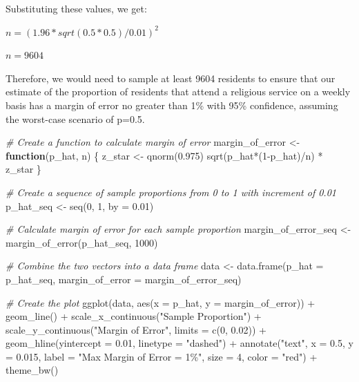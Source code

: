 \documentclass[
]{article}
\newenvironment{Shaded}{\begin{snugshade}}{\end{snugshade}}
\newcommand{\AttributeTok}[1]{\textcolor[rgb]{0.77,0.63,0.00}{#1}}
\newcommand{\CommentTok}[1]{\textcolor[rgb]{0.56,0.35,0.01}{\textit{#1}}}
\newcommand{\ControlFlowTok}[1]{\textcolor[rgb]{0.13,0.29,0.53}{\textbf{#1}}}
\newcommand{\DecValTok}[1]{\textcolor[rgb]{0.00,0.00,0.81}{#1}}
\newcommand{\FloatTok}[1]{\textcolor[rgb]{0.00,0.00,0.81}{#1}}
\newcommand{\FunctionTok}[1]{\textcolor[rgb]{0.00,0.00,0.00}{#1}}
\newcommand{\NormalTok}[1]{#1}
\newcommand{\OtherTok}[1]{\textcolor[rgb]{0.56,0.35,0.01}{#1}}
\newcommand{\SpecialCharTok}[1]{\textcolor[rgb]{0.00,0.00,0.00}{#1}}
\newcommand{\StringTok}[1]{\textcolor[rgb]{0.31,0.60,0.02}{#1}}
\begin{document}
Substituting these values, we get:

\(n = (1.96 * sqrt(0.5 * 0.5) / 0.01)^2\)

\(n = 9604\)

Therefore, we would need to sample at least 9604 residents to ensure
that our estimate of the proportion of residents that attend a religious
service on a weekly basis has a margin of error no greater than 1\% with
95\% confidence, assuming the worst-case scenario of p=0.5.

\begin{Shaded}
\begin{Highlighting}[]
\CommentTok{\# Create a function to calculate margin of error}
\NormalTok{margin\_of\_error }\OtherTok{\textless{}{-}} \ControlFlowTok{function}\NormalTok{(p\_hat, n) \{}
\NormalTok{  z\_star }\OtherTok{\textless{}{-}} \FunctionTok{qnorm}\NormalTok{(}\FloatTok{0.975}\NormalTok{)}
  \FunctionTok{sqrt}\NormalTok{(p\_hat}\SpecialCharTok{*}\NormalTok{(}\DecValTok{1}\SpecialCharTok{{-}}\NormalTok{p\_hat)}\SpecialCharTok{/}\NormalTok{n) }\SpecialCharTok{*}\NormalTok{ z\_star}
\NormalTok{\}}

\CommentTok{\# Create a sequence of sample proportions from 0 to 1 with increment of 0.01}
\NormalTok{p\_hat\_seq }\OtherTok{\textless{}{-}} \FunctionTok{seq}\NormalTok{(}\DecValTok{0}\NormalTok{, }\DecValTok{1}\NormalTok{, }\AttributeTok{by =} \FloatTok{0.01}\NormalTok{)}

\CommentTok{\# Calculate margin of error for each sample proportion}
\NormalTok{margin\_of\_error\_seq }\OtherTok{\textless{}{-}} \FunctionTok{margin\_of\_error}\NormalTok{(p\_hat\_seq, }\DecValTok{1000}\NormalTok{)}

\CommentTok{\# Combine the two vectors into a data frame}
\NormalTok{data }\OtherTok{\textless{}{-}} \FunctionTok{data.frame}\NormalTok{(}\AttributeTok{p\_hat =}\NormalTok{ p\_hat\_seq, }\AttributeTok{margin\_of\_error =}\NormalTok{ margin\_of\_error\_seq)}

\CommentTok{\# Create the plot}
\FunctionTok{ggplot}\NormalTok{(data, }\FunctionTok{aes}\NormalTok{(}\AttributeTok{x =}\NormalTok{ p\_hat, }\AttributeTok{y =}\NormalTok{ margin\_of\_error)) }\SpecialCharTok{+} 
  \FunctionTok{geom\_line}\NormalTok{() }\SpecialCharTok{+}
  \FunctionTok{scale\_x\_continuous}\NormalTok{(}\StringTok{"Sample Proportion"}\NormalTok{) }\SpecialCharTok{+}
  \FunctionTok{scale\_y\_continuous}\NormalTok{(}\StringTok{"Margin of Error"}\NormalTok{, }\AttributeTok{limits =} \FunctionTok{c}\NormalTok{(}\DecValTok{0}\NormalTok{, }\FloatTok{0.02}\NormalTok{)) }\SpecialCharTok{+}
  \FunctionTok{geom\_hline}\NormalTok{(}\AttributeTok{yintercept =} \FloatTok{0.01}\NormalTok{, }\AttributeTok{linetype =} \StringTok{"dashed"}\NormalTok{) }\SpecialCharTok{+}
  \FunctionTok{annotate}\NormalTok{(}\StringTok{"text"}\NormalTok{, }\AttributeTok{x =} \FloatTok{0.5}\NormalTok{, }\AttributeTok{y =} \FloatTok{0.015}\NormalTok{, }\AttributeTok{label =} \StringTok{"Max Margin of Error = 1\%"}\NormalTok{, }\AttributeTok{size =} \DecValTok{4}\NormalTok{, }\AttributeTok{color =} \StringTok{"red"}\NormalTok{) }\SpecialCharTok{+}
  \FunctionTok{theme\_bw}\NormalTok{()}
\end{Highlighting}
\end{Shaded}
\end{document}
